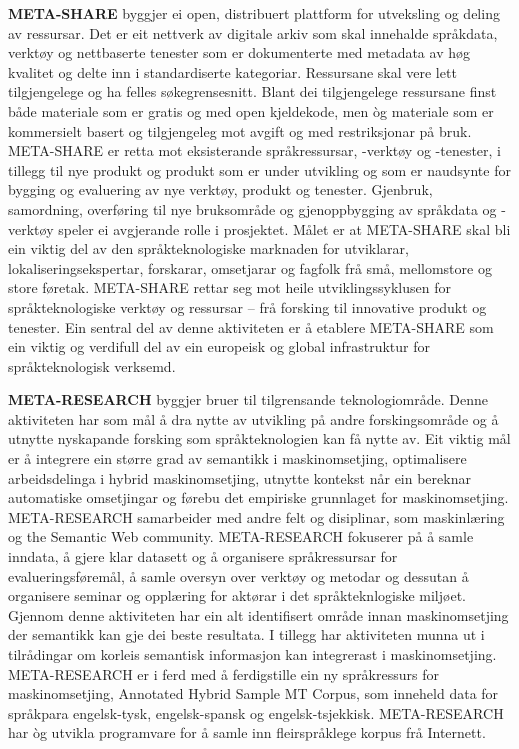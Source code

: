 \begin{multicols}{2}
\textbf{META-SHARE} byggjer ei open, distribuert plattform for utveksling og deling av ressursar. Det er eit nettverk av digitale arkiv som skal innehalde språkdata, verktøy og nettbaserte tenester som er dokumenterte med metadata av høg kvalitet og delte inn i standardiserte kategoriar. Ressursane skal vere lett tilgjengelege og ha felles søkegrensesnitt. Blant dei tilgjengelege ressursane finst både materiale som er gratis og med open kjeldekode, men òg materiale som er kommersielt basert og tilgjengeleg mot avgift og med restriksjonar på bruk. META-SHARE er retta mot eksisterande språkressursar, -verktøy og -tenester, i tillegg til nye produkt og produkt som er under utvikling og som er naudsynte for bygging og evaluering av nye verktøy, produkt og tenester. Gjenbruk, samordning, overføring til nye bruksområde og gjenoppbygging av språkdata og -verktøy speler ei avgjerande rolle i prosjektet. Målet er at META-SHARE skal bli ein viktig del av den språkteknologiske marknaden for utviklarar, lokaliseringsekspertar, forskarar, omsetjarar og fagfolk frå små, mellomstore og store føretak. META-SHARE rettar seg mot heile utviklingssyklusen for språkteknologiske verktøy og ressursar – frå forsking til innovative produkt og tenester. Ein sentral del av denne aktiviteten er å etablere META-SHARE som ein viktig og verdifull del av ein europeisk og global infrastruktur for språkteknologisk verksemd. 

\textbf{META-RESEARCH} byggjer bruer til tilgrensande teknologiområde. Denne aktiviteten har som mål å dra nytte av utvikling på andre forskingsområde og å utnytte nyskapande forsking som språkteknologien kan få nytte av. Eit viktig mål er å integrere ein større grad av semantikk i maskinomsetjing, optimalisere arbeidsdelinga i hybrid maskinomsetjing, utnytte kontekst når ein bereknar automatiske omsetjingar og førebu det empiriske grunnlaget for maskinomsetjing. META-RESEARCH samarbeider med andre felt og disiplinar, som maskinlæring og the Semantic Web community. META-RESEARCH fokuserer på å samle inndata, å gjere klar datasett og å organisere språkressursar for evalueringsføremål, å samle oversyn over verktøy og metodar og dessutan å organisere seminar og opplæring for aktørar i det språkteknlogiske miljøet. Gjennom denne aktiviteten har ein alt identifisert område innan maskinomsetjing der semantikk kan gje dei beste resultata. I tillegg har aktiviteten munna ut i tilrådingar om korleis semantisk informasjon kan integrerast i maskinomsetjing. META-RESEARCH er i ferd med å ferdigstille ein ny språkressurs for maskinomsetjing, Annotated Hybrid Sample MT Corpus, som inneheld data for språkpara engelsk-tysk, engelsk-spansk og engelsk-tsjekkisk. META-RESEARCH har òg utvikla programvare for å samle inn fleirspråklege korpus frå Internett.
\end{multicols}
